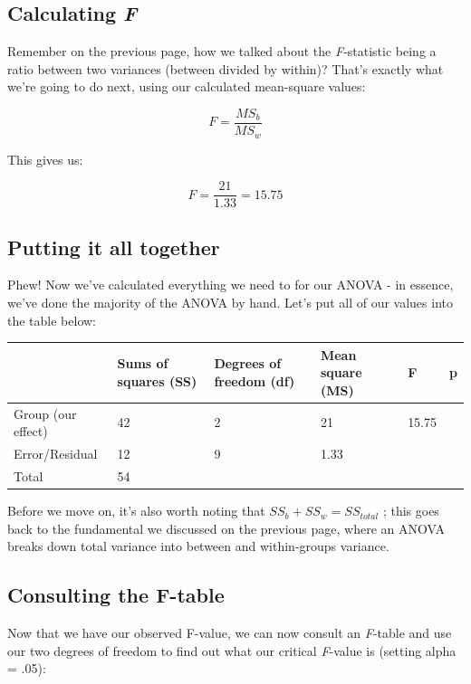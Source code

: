 \documentclass[
]{book}
\begin{document}
\hypertarget{calculating-f}{%
\subsection{\texorpdfstring{Calculating \emph{F}}{Calculating F}}\label{calculating-f}}

Remember on the previous page, how we talked about the \emph{F}-statistic being
a ratio between two variances (between divided by within)? That's
exactly what we're going to do next, using our calculated mean-square
values:

\[
F = \frac{MS_b}{MS_w}
\]

This gives us:

\[
F = \frac{21}{1.33} = 15.75
\]

\hypertarget{putting-it-all-together}{%
\subsection{Putting it all together}\label{putting-it-all-together}}

Phew! Now we've calculated everything we need to for our ANOVA - in
essence, we've done the majority of the ANOVA by hand. Let's put all of
our values into the table below:

\begin{tabular}{l|l|l|l|l|l}
\hline
 & Sums of squares (SS) & Degrees of freedom (df) & Mean square (MS) & F & p\\
\hline
Group (our effect) & 42 & 2 & 21 & 15.75 & \\
\hline
Error/Residual & 12 & 9 & 1.33 &  & \\
\hline
Total & 54 &  &  &  & \\
\hline
\end{tabular}

Before we move on, it's also worth noting that
\(SS_b + SS_w = SS_{total}\) ; this goes back to the fundamental we
discussed on the previous page, where an ANOVA breaks down total
variance into between and within-groups variance.

\hypertarget{consulting-the-f-table}{%
\subsection{Consulting the F-table}\label{consulting-the-f-table}}

Now that we have our observed F-value, we can now consult an \emph{F}-table and
use our two degrees of freedom to find out what our critical \emph{F}-value is
(setting alpha = .05):
\end{document}
